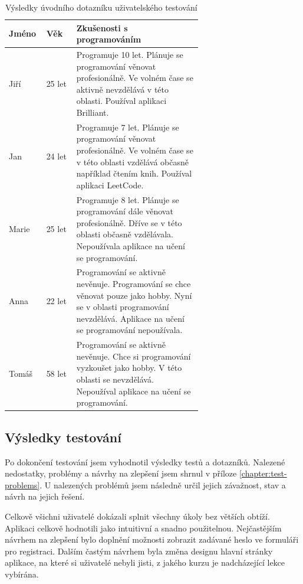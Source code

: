 \begin{table}[ht]
    \centering
    \begin{tabular}{@{} l l p{0.65\linewidth} @{}}
        \toprule
        Jméno & Věk & Zkušenosti s programováním \\
        \midrule
        Jiří  & 25 let & Programuje 10 let. Plánuje se programování věnovat profesionálně. Ve volném čase se aktivně nevzdělává v této oblasti. Používal aplikaci Brilliant. \\
        \midrule
        Jan   & 24 let & Programuje 7 let. Plánuje se programování věnovat profesionálně. Ve volném čase se v této oblasti vzdělává občasně například čtením knih. Používal aplikaci LeetCode. \\
        \midrule
        Marie & 25 let & Programuje 8 let. Plánuje se programování dále věnovat profesionálně. Dříve se v této oblasti občasně vzdělávala. Nepoužívala aplikace na učení se programování. \\
        \midrule
        Anna  & 22 let & Programování se aktivně nevěnuje. Programování se chce věnovat pouze jako hobby. Nyní se v oblasti programování nevzdělává. Aplikace na učení se programování nepoužívala. \\
        \midrule
        Tomáš & 58 let & Programování se aktivně nevěnuje. Chce si programování vyzkoušet jako hobby. V této oblasti se nevzdělává. Nepoužíval aplikace na učení se programování. \\
        \bottomrule
    \end{tabular}
    \captionsetup{justification=centering}
    \caption{Výsledky úvodního dotazníku uživatelského testování}
    \label{table:table-testers}
\end{table}

\subsection{Výsledky testování}

Po dokončení testování jsem vyhodnotil výsledky testů a dotazníků. Nalezené nedostatky, problémy a návrhy na zlepšení jsem shrnul v příloze \ref{chapter:test-problems}. U nalezených problémů jsem následně určil jejich závažnost, stav a návrh na jejich řešení.

Celkově všichni uživatelé dokázali splnit všechny úkoly bez větších obtíží. Aplikaci celkově hodnotili jako intuitivní a snadno použitelnou. Nejčastějším návrhem na zlepšení bylo doplnění možnosti zobrazit zadávané heslo ve formuláři pro registraci. Dalším častým návrhem byla změna designu hlavní stránky aplikace, na které si uživatelé nebyli jisti, z jakého kurzu je nadcházející lekce vybírána. 


